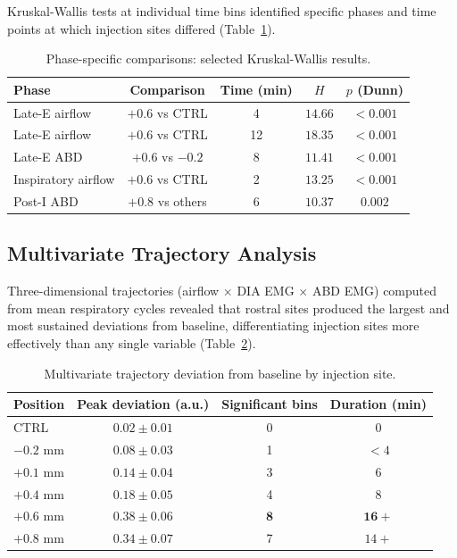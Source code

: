 \documentclass[11pt]{article}
\begin{document}
Kruskal-Wallis tests at individual time bins identified specific phases and time points at which injection sites differed (Table~\ref{tab:phase}).

\begin{table}[H]
\centering
\caption{Phase-specific comparisons: selected Kruskal-Wallis results.}
\label{tab:phase}
\begin{tabular}{lcccc}
\toprule
\textbf{Phase} & \textbf{Comparison} & \textbf{Time (min)} & \textbf{$H$} & \textbf{$p$ (Dunn)} \\
\midrule
Late-E airflow & $+0.6$ vs CTRL & 4 & $14.66$ & $<0.001$ \\
Late-E airflow & $+0.6$ vs CTRL & 12 & $18.35$ & $<0.001$ \\
Late-E ABD & $+0.6$ vs $-0.2$ & 8 & $11.41$ & $<0.001$ \\
Inspiratory airflow & $+0.6$ vs CTRL & 2 & $13.25$ & $<0.001$ \\
Post-I ABD & $+0.8$ vs others & 6 & $10.37$ & $0.002$ \\
\bottomrule
\end{tabular}
\end{table}

\subsection{Multivariate Trajectory Analysis}

Three-dimensional trajectories (airflow $\times$ DIA EMG $\times$ ABD EMG) computed from mean respiratory cycles revealed that rostral sites produced the largest and most sustained deviations from baseline, differentiating injection sites more effectively than any single variable (Table~\ref{tab:trajectory}).

\begin{table}[H]
\centering
\caption{Multivariate trajectory deviation from baseline by injection site.}
\label{tab:trajectory}
\begin{tabular}{lccc}
\toprule
\textbf{Position} & \textbf{Peak deviation (a.u.)} & \textbf{Significant bins} & \textbf{Duration (min)} \\
\midrule
CTRL & $0.02 \pm 0.01$ & 0 & 0 \\
$-0.2$ mm & $0.08 \pm 0.03$ & 1 & $<4$ \\
$+0.1$ mm & $0.14 \pm 0.04$ & 3 & $6$ \\
$+0.4$ mm & $0.18 \pm 0.05$ & 4 & $8$ \\
$+0.6$ mm & $\mathbf{0.38 \pm 0.06}$ & $\mathbf{8}$ & $\mathbf{16+}$ \\
$+0.8$ mm & $0.34 \pm 0.07$ & 7 & $14+$ \\
\bottomrule
\end{tabular}
\end{table}
\end{document}
